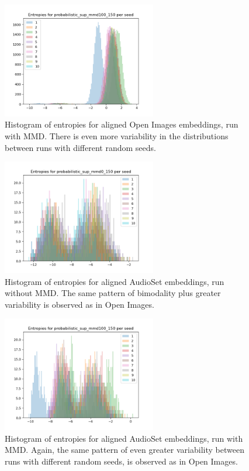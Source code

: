 \begin{figure}[H]

    \centering
    \includegraphics[width=0.6\textwidth]{images/method/probabilistic_aligned/openimages/probabilistic_sup_mmd100_150_entropies.png}
    \caption{
        Histogram of entropies for aligned Open Images embeddings, run with MMD. There is even more variability in the distributions between runs with different random seeds. 
    }
\end{figure}

\begin{figure}[H]
    \centering
    \includegraphics[width=0.6\textwidth]{images/method/probabilistic_aligned/audioset/probabilistic_sup_mmd0_150_entropies.png}
    \caption{
        Histogram of entropies for aligned AudioSet embeddings, run without MMD. The same pattern of bimodality plus greater variability is observed as in Open Images. 
    }
\end{figure}

\begin{figure}[H]

    \centering
    \includegraphics[width=0.6\textwidth]{images/method/probabilistic_aligned/audioset/probabilistic_sup_mmd100_150_entropies.png}
    \caption{
        Histogram of entropies for aligned AudioSet embeddings, run with MMD. Again, the same pattern of even greater variability between runs with different random seeds, is observed as in Open Images. 
    }
\end{figure}

